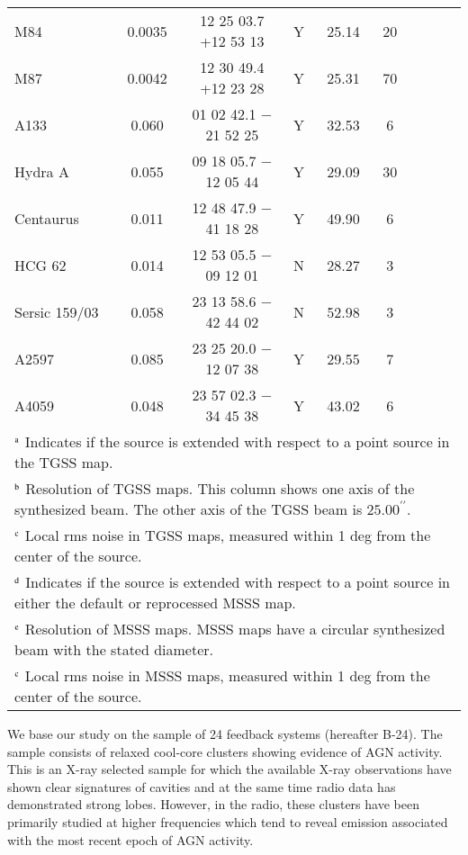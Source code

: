 \documentclass{aa}  %
\begin{document}
\begin{table*}[ht]
\begin{center}
{\begin{tabular}{l|c| c| c c c| c c c}
		M84						& 0.0035	& 12 25 03.7 +12 53 13	&	Y		&	25.14	&	20		&				&					\\
		M87						& 0.0042	& 12 30 49.4 +12 23 28	&	Y		&	25.31	&	70		&				&					\\
		A133						& 0.060		& 01 02 42.1 $-$21 52 25	&	Y		&	32.53	&	6		&				&					\\
		Hydra A					& 0.055		& 09 18 05.7 $-$12 05 44	&	Y		&	29.09	&	30		&				&					\\
		Centaurus				& 0.011		& 12 48 47.9 $-$41 18 28	&	Y		&	49.90	&	6		&				&					\\
		HCG 62					& 0.014		& 12 53 05.5 $-$09 12 01	&	N		&	28.27	&	3		&				&					\\
		Sersic 159/03			& 0.058		& 23 13 58.6 $-$42 44 02	&	N		&	52.98	&	3		&				&					\\
		A2597					& 0.085		& 23 25 20.0 $-$12 07 38	&	Y		&	29.55	&	7		&				&					\\
		A4059					& 0.048		& 23 57 02.3 $-$34 45 38	&	Y		&	43.02	&	6		&				&					\\
		\hline
		\multicolumn{9}{l}{$\rm{^a}$ Indicates if the source is extended with respect to a point source in the TGSS map.} \\
		\multicolumn{9}{l}{$\rm{^b}$ Resolution of TGSS maps. This column shows one axis of the synthesized beam. The other axis of the TGSS beam is $25.00^{\prime\prime}$.} \\
		\multicolumn{9}{l}{$\rm{^c}$ Local rms noise in TGSS maps, measured within 1 deg from the center of the source.} \\
		\multicolumn{9}{l}{$\rm{^d}$ Indicates if the source is extended with respect to a point source in either the default or reprocessed MSSS map.} \\
		\multicolumn{9}{l}{$\rm{^e}$ Resolution of MSSS maps. MSSS maps have a circular synthesized beam with the stated diameter.} \\
		\multicolumn{9}{l}{$\rm{^c}$ Local rms noise in MSSS maps, measured within 1 deg from the center of the source.} \\
	\end{tabular}
	
	}
	
	\label{tab:source_properties}
	\end{center}
\end{table*}



We base our study on the \cite{Birzan2008} sample of 24 feedback systems (hereafter B-24). 
The sample consists of relaxed cool-core clusters showing evidence of AGN activity. 
This is an X-ray selected sample for which the available X-ray observations have shown clear signatures of cavities and at the same time radio data has demonstrated strong lobes.
However, in the radio, these clusters have been primarily studied at higher frequencies which tend to reveal emission associated with the most recent epoch of AGN activity. 
\end{document}
